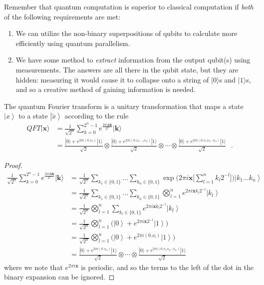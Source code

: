 \documentclass{article}
\newcommand{\ket}[1]{\ensuremath{\left|#1\right\rangle}}
\begin{document}
    Remember that quantum computation is superior to classical computation if \textit{both} of the following requirements are met: 
    \begin{enumerate}
      \item We can utilize the non-binary superpositions of qubits to calculate more efficiently using quantum parallelism. 
      \item We have some method to \textit{extract} information from the output qubit(s) using measurements. The answers are all there in the qubit state, but they are hidden: measuring it would cause it to collapse onto a string of $|0\rangle$s and $|1\rangle$s, and so a creative method of gaining information is needed. 
    \end{enumerate}

    \begin{theorem}
      The quantum Fourier transform is a unitary transformation that maps a state $\ket{x}$ to a state $\ket{\tilde{x}}$ according to the rule 
      \begin{align}
      QFT|\mathbf{x}\rangle &= 
      \frac{1}{\sqrt{2^n}} \sum_{k = 0}^{2^n-1} e^{\frac{2 \pi i \mathbf{x} \mathbf{k} }{2^n}} |\mathbf{k}\rangle \\ & = \frac{|0 \rangle + e^{2\pi i (0.x_n)}|1\rangle}{\sqrt{2}} \otimes \frac{|0\rangle + e^{2 \pi i (0.x_{n-1}x_n)}|1\rangle}{\sqrt{2}} \otimes \cdots \otimes \frac{|0\rangle + e^{2 \pi i (0.x_1 x_2\cdots x_n)}|1\rangle}{\sqrt{2}} \ \ \ .
      \end{align}
    \end{theorem}
    \begin{proof} 
      \begin{align} 
        \frac{1}{\sqrt{2^n}} \sum_{k = 0}^{2^n-1} e^{\frac{2 \pi i \mathbf{x} \mathbf{k} }{2^n}} |\mathbf{k}\rangle 
        & = \frac{1}{\sqrt{2^n}} \sum_{k_1 \in \{0, 1\}} \ldots \sum_{k_n \in \{0, 1\}} \exp \bigg( 2 \pi i \mathbf{x} \Big[ \sum_{l=1}^n k_l 2^{-l} \Big]\bigg) \ket{k_1 \ldots k_n} \\
        & = \frac{1}{\sqrt{2^n}} \sum_{k_1 \in \{0, 1\}} \ldots \sum_{k_n \in \{0, 1\}} \bigotimes_{l=1}^n e^{2 \pi i \mathbf{x} k_l 2^{-l}} \ket{k_l} \\
        & = \frac{1}{\sqrt{2^n}} \bigotimes_{l=1}^n \sum_{k_l \in \{0, 1\}} e^{2 \pi i \mathbf{x} k_l 2^{-l}} \ket{k_l} \\
        & = \frac{1}{\sqrt{2^n}} \bigotimes_{l=1}^n \bigg( \ket{0} + e^{2 \pi i \mathbf{x} 2^{-l}} \ket{1} \bigg) \\ 
        & = \frac{1}{\sqrt{2^n}} \bigotimes_{l=1}^n \bigg( \ket{0} + e^{2 \pi i (0.x_l)} \ket{1} \bigg) \\ 
        & = \frac{|0 \rangle + e^{2\pi i (0.x_n)}|1\rangle}{\sqrt{2}} \otimes \cdots \otimes \frac{|0\rangle + e^{2 \pi i (0.x_1 x_2\cdots x_n)}|1\rangle}{\sqrt{2}} 
      \end{align}
      where we note that $e^{2 \pi i \mathbf{x}}$ is periodic, and so the terms to the left of the dot in the binary expansion can be ignored. 
    \end{proof}
\end{document}
